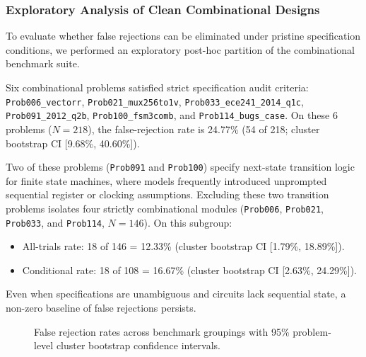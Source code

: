 \documentclass[conference]{IEEEtran}
\begin{document}
\subsubsection{Exploratory Analysis of Clean Combinational Designs}
To evaluate whether false rejections can be eliminated under pristine specification conditions, we performed an exploratory post-hoc partition of the combinational benchmark suite. 

Six combinational problems satisfied strict specification audit criteria: \texttt{Prob006\_vectorr}, \texttt{Prob021\_mux256to1v}, \texttt{Prob033\_ece241\_2014\_q1c}, \texttt{Prob091\_2012\_q2b}, \texttt{Prob100\_fsm3comb}, and \texttt{Prob114\_bugs\_case}. On these 6 problems ($N=218$), the false-rejection rate is 24.77\% (54 of 218; cluster bootstrap CI [9.68\%, 40.60\%]). 

Two of these problems (\texttt{Prob091} and \texttt{Prob100}) specify next-state transition logic for finite state machines, where models frequently introduced unprompted sequential register or clocking assumptions. Excluding these two transition problems isolates four strictly combinational modules (\texttt{Prob006}, \texttt{Prob021}, \texttt{Prob033}, and \texttt{Prob114}, $N=146$). On this subgroup:
\begin{itemize}
    \item All-trials rate: 18 of 146 = 12.33\% (cluster bootstrap CI [1.79\%, 18.89\%]).
    \item Conditional rate: 18 of 108 = 16.67\% (cluster bootstrap CI [2.63\%, 24.29\%]).
\end{itemize}
Even when specifications are unambiguous and circuits lack sequential state, a non-zero baseline of false rejections persists.

\begin{figure}[t]
\centering
{}
\caption{False rejection rates across benchmark groupings with 95\% problem-level cluster bootstrap confidence intervals.}
\label{fig:rates_chart}
\end{figure}
\end{document}
